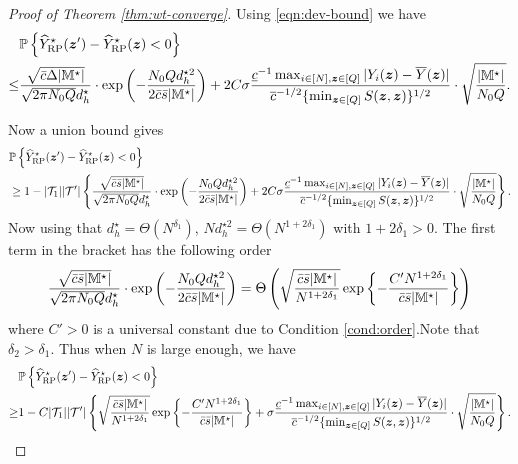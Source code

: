 \documentclass[12pt]{article}
\begin{document}
\begin{proof}[Proof of Theorem \ref{thm:wt-converge}]
Using \eqref{eqn:dev-bound} we have
\begin{align*}
    &{\mathbb{P}}\left\{{\widehat{Y}}^\star_{\operatorname{RP}}({\boldsymbol{z}}') - {\widehat{Y}}^\star_{\operatorname{RP}}({\boldsymbol{z}}) < 0\right\} \\
    \le& \frac{\sqrt{\bar{c}\Delta|{\mathbb{M}}^\star|}}{\sqrt{2\pi N_0Q }d_h^\star}\cdot \exp\left(-\frac{ N_0Q d_h^{\star 2}}{2\bar{c}\bar{s}|{\mathbb{M}}^\star|}\right) + 2C\sigma   \frac{ \underline{c}^{-1} \max_{i\in[N],{\boldsymbol{z}}\in[Q]}|Y_i({\boldsymbol{z}})-\overline{Y}({\boldsymbol{z}})|}{ {\overline{c}^{-1/2} \{\min_{{\boldsymbol{z}}\in[Q]} S({\boldsymbol{z}},{\boldsymbol{z}})}\}^{1/2}}\cdot \sqrt{\frac{|{\mathbb{M}}^\star|}{N_0Q}}.
\end{align*}

Now a union bound gives 
\begin{align*}
    &{\mathbb{P}}\left\{{\widehat{Y}}^\star_{\operatorname{RP}}({\boldsymbol{z}}') - {\widehat{Y}}^\star_{\operatorname{RP}}({\boldsymbol{z}}) < 0\right\}\\
    &\ge 1 - |{\mathcal{T}}_{1}||{\mathcal{T}}'|\left\{\frac{\sqrt{\bar{c}\bar{s}|{\mathbb{M}}^\star|}}{\sqrt{2\pi N_0Q }d_h^\star}\cdot \exp\left(-\frac{ N_0Q d_h^{\star 2}}{2\bar{c}\bar{s}|{\mathbb{M}}^\star|}\right) + 2C\sigma   \frac{ \underline{c}^{-1} \max_{i\in[N],{\boldsymbol{z}}\in[Q]}|Y_i({\boldsymbol{z}})-\overline{Y}({\boldsymbol{z}})|}{ {\overline{c}^{-1/2} \{\min_{{\boldsymbol{z}}\in[Q]} S({\boldsymbol{z}},{\boldsymbol{z}})}\}^{1/2}}\cdot \sqrt{\frac{|{\mathbb{M}}^\star|}{N_0Q}}\right\}.
\end{align*}
Now using that $d_h^\star =  \Theta(N^{\delta_1})$, $Nd_h^{\star2} =  \Theta(N^{1+2\delta_1})$ with $1+2\delta_1>0$. The first term in the bracket has the following order
\begin{align*}
\frac{\sqrt{\bar{c}\bar{s}|{\mathbb{M}}^\star|}}{\sqrt{2\pi N_0Q }d_h^\star}\cdot \exp\left(-\frac{ N_0Q d_h^{\star 2}}{2\bar{c}\bar{s}|{\mathbb{M}}^\star|}\right) = \Theta\left(\sqrt{\frac{\bar{c}\bar{s}|{\mathbb{M}}^\star|}{N^{1+2\delta_1}}}\exp\left\{-\frac{C'N^{1+2\delta_1}}{\bar{c}\bar{s}|{\mathbb{M}}^\star|}\right\}\right)
\end{align*}
where $C'>0$ is a universal constant due to Condition \ref{cond:order}.Note that $\delta_2 > \delta_1$. Thus when $N$ is large enough, we have
\begin{align}
    &{\mathbb{P}}\left\{{\widehat{Y}}^\star_{\operatorname{RP}}({\boldsymbol{z}}') - {\widehat{Y}}^\star_{\operatorname{RP}}({\boldsymbol{z}}) < 0\right\}
    \notag\\
    \ge &1 -  C|{\mathcal{T}}_{1}||{\mathcal{T}}'|\left\{\sqrt{\frac{\bar{c}\bar{s}|{\mathbb{M}}^\star|}{N^{1+2\delta_1}}}\exp\left\{-\frac{C'N^{1+2\delta_1}}{\bar{c}\bar{s}|{\mathbb{M}}^\star|}\right\} + \sigma   \frac{ \underline{c}^{-1} \max_{i\in[N],{\boldsymbol{z}}\in[Q]}|Y_i({\boldsymbol{z}})-\overline{Y}({\boldsymbol{z}})|}{ {\overline{c}^{-1/2} \{\min_{{\boldsymbol{z}}\in[Q]} S({\boldsymbol{z}},{\boldsymbol{z}})}\}^{1/2}}\cdot \sqrt{\frac{|{\mathbb{M}}^\star|}{N_0Q}}\right\}.\label{eqn:order}
\end{align}




\end{proof}
\end{document}
